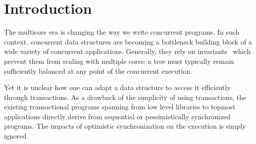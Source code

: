 \section{Introduction}

The multicore era is changing the way we write concurrent programs.
In such context, concurrent data structures are becoming a bottleneck building 
block of a wide variety of concurrent applications.
Generally, they rely on invariants~\cite{Sha2011} which prevent them from scaling with multiple cores: 
a tree must typically remain sufficiently balanced at any point of the concurrent execution.


Yet it is unclear how one can adapt a data structure to 
access it efficiently through transactions.
As a drawback of the simplicity of using transactions, 
the existing transactional programs spanning from low level libraries to 
topmost applications directly derive from sequential or pessimistically synchronized programs.
The impacts of optimistic synchronization on the execution is simply ignored. 

